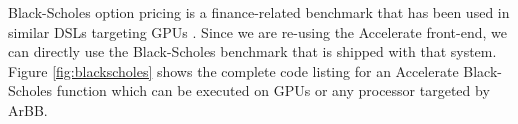 \documentclass[conference]{IEEEtran}
\newcommand{\rnote}[1]{\begin{itemize}\item{\textcolor{blue}{#1}}\end{itemize}}
\newcommand{\rnote}[1]{}
\newcommand{\systemname}[0]{{Harbb}}
\begin{document}








Black-Scholes option pricing is a finance-related benchmark that has been used in similar
DSLs targeting GPUs \cite{Accelerate, nikola}. Since we are re-using the 
Accelerate front-end, we can directly use the Black-Scholes benchmark that 
is shipped with that system.  Figure \ref{fig:blackscholes} shows the
complete code listing for an Accelerate Black-Scholes function which
can be executed on GPUs or any processor targeted by ArBB.

%

\end{document}
